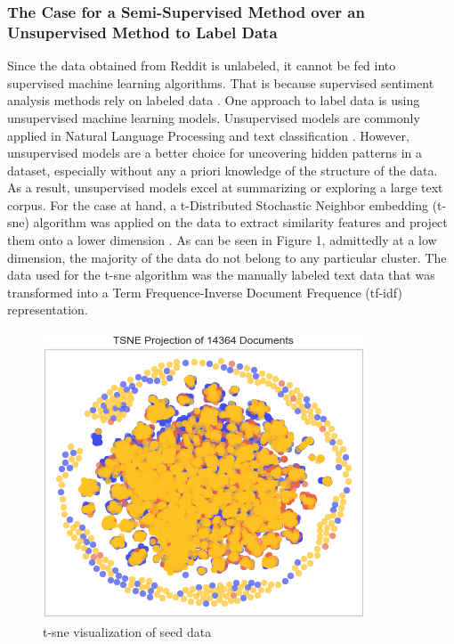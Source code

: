 \documentclass[11pt, a4paper]{article}
\begin{document}
\subsubsection{The Case for a Semi-Supervised Method over an Unsupervised Method to Label Data}
Since the data obtained from Reddit is unlabeled, it cannot be fed into supervised machine learning algorithms. 
That is because supervised sentiment analysis methods rely on labeled data \citep{sazzed2021ssentia}. One approach to label 
data is using unsupervised machine learning models. Unsupervised models are commonly applied in Natural Language Processing 
and text classification \citep{jung2019automatedclassification}. However, unsupervised models are a better choice for uncovering hidden 
patterns in a dataset, especially without any a priori knowledge of the structure of the data. As a result, unsupervised models 
excel at summarizing or exploring a large text corpus. 
For the case at hand, a t-Distributed Stochastic Neighbor embedding (t-sne) algorithm was applied on the data to extract similarity 
features and project them onto a lower dimension \citep{binu2020dimreductiontsne}. As can be seen in Figure 1, admittedly 
at a low dimension, the majority of the data do not belong to any particular cluster. The data used for the t-sne algorithm was the
manually labeled text data that was transformed into a Term Frequence-Inverse Document Frequence (tf-idf) representation.

\begin{figure} %
    \centering
    \includegraphics[width=\textwidth]{tsne_projection.png}
    \caption{t-sne visualization of seed data}
    \label{fig:t-sne}
\end{figure}
\end{document}
